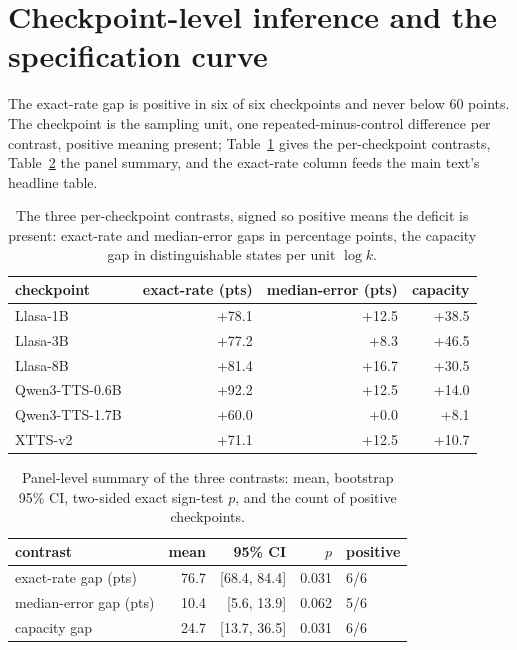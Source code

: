 \section{Checkpoint-level inference and the specification curve}
\label{sec:inference}

The exact-rate gap is positive in six of six checkpoints and never below $60$ points. The
checkpoint is the sampling unit, one repeated-minus-control difference per contrast, positive
meaning present; Table~\ref{tab:percheck} gives the per-checkpoint contrasts,
Table~\ref{tab:paneltests} the panel summary, and the exact-rate column feeds
the main text's headline table.

\begin{table}[tp]\centering
\caption{The three per-checkpoint contrasts, signed so positive means the deficit is present: exact-rate and median-error gaps in percentage points, the capacity gap in distinguishable states per unit $\log k$.}
\label{tab:percheck}
\begin{tabular}{lrrr}
\toprule
checkpoint & exact-rate (pts) & median-error (pts) & capacity \\
\midrule
Llasa-1B~\cite{ye2025llasa} & +78.1 & +12.5 & +38.5 \\
Llasa-3B & +77.2 & +8.3 & +46.5 \\
Llasa-8B & +81.4 & +16.7 & +30.5 \\
Qwen3-TTS-0.6B~\cite{hu2026qwen3tts} & +92.2 & +12.5 & +14.0 \\
Qwen3-TTS-1.7B & +60.0 & +0.0 & +8.1 \\
XTTS-v2~\cite{casanova2024xtts} & +71.1 & +12.5 & +10.7 \\
\bottomrule
\end{tabular}
\end{table}

\begin{table}[tp]\centering
\caption{Panel-level summary of the three contrasts: mean, bootstrap 95\% CI, two-sided exact sign-test $p$, and the count of positive checkpoints.}
\label{tab:paneltests}
\begin{tabular}{lrrrl}
\toprule
contrast & mean & 95\% CI & $p$ & positive \\
\midrule
exact-rate gap (pts) & 76.7 & [68.4, 84.4] & 0.031 & 6/6 \\
median-error gap (pts) & 10.4 & [5.6, 13.9] & 0.062 & 5/6 \\
capacity gap & 24.7 & [13.7, 36.5] & 0.031 & 6/6 \\
\bottomrule
\end{tabular}
\end{table}

